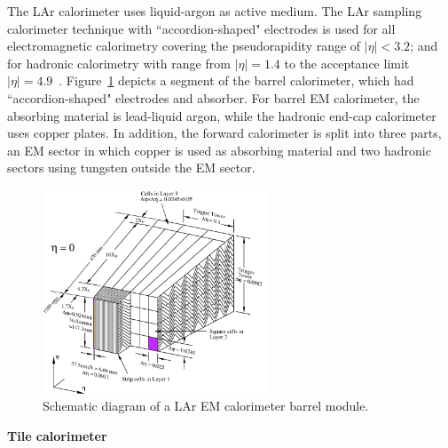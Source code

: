 The LAr calorimeter uses liquid-argon as active medium.
The LAr sampling calorimeter technique with ``accordion-shaped" electrodes is used for all electromagnetic calorimetry covering the pseudorapidity range of $|\eta|<3.2$;
and for hadronic calorimetry with range from $|\eta| = 1.4$ to the acceptance limit $|\eta| = 4.9$~\cite{CERN-LHCC-96-041}.
Figure~\ref{fig:calo_lar} depicts a segment of the barrel calorimeter, which had ``accordion-shaped" electrodes and absorber.
For barrel EM calorimeter, the absorbing material is lead-liquid argon, while the hadronic end-cap calorimeter uses copper plates.
In addition, the forward calorimeter is split into three parts, an EM sector in which copper is used as absorbing material and two hadronic sectors using tungsten outside the EM sector.
\begin{figure}[!htb]
  \centering
  \includegraphics[width=0.6\textwidth]{figures/Detector/calo_lar.png}
  \caption{Schematic diagram of a LAr EM calorimeter barrel module.}
  \label{fig:calo_lar}
\end{figure}

\textbf{Tile calorimeter}

